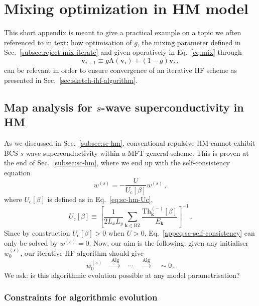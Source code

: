 \chapter{Mixing optimization in HM model}\label{app:sc-g-opt}

This short appendix is meant to give a practical example on a topic we often referenced to in text: how optimisation of $g$, the mixing parameter defined in Sec.~\ref{subsec:reject-mix-iterate} and given operatively in  Eq.~\eqref{eq:mix} through
\[
	\mathbf{v}_{i+1} \equiv g \mathrm{A} \left( \mathbf{v}_{i} \right) + (1-g) \mathbf{v}_{i} \, ,
\]
can be relevant in order to ensure convergence of an iterative HF scheme as presented in Sec.~\ref{sec:sketch-ihf-algorithm}.

\section{Map analysis for $s$-wave superconductivity in HM}

As we discussed in Sec.~\ref{subsec:sc-hm}, conventional repulsive HM cannot exhibit BCS $s$-wave superconductivity within a MFT general scheme. This is proven at the end of Sec.~\ref{subsec:sc-hm}, where we end up with the self-consistency equation
\begin{equation}\label{appeq:sc-self-consistency}
	w^{(s)} = -\frac{U}{U_\mathrm{c}[\beta]} w^{(s)} \, ,
\end{equation}
where $U_\mathrm{c}[\beta]$ is defined as in Eq.~\eqref{eq:sc-hm-Uc},
\begin{equation}\label{appeq:sc-hm-Uc}
	U_\mathrm{c}[\beta] \equiv \left[
	\frac{1}{2 L_x L_y} \sum_{\mathbf{k}\in\mathrm{BZ}} \frac{\mathrm{Th}_\mathbf{k}^{(-)}[\beta]}{E_\mathbf{k}}
	\right]^{-1} \, .
\end{equation}
Since by construction $U_\mathrm{c}[\beta] > 0$ when $U>0$, Eq.~\eqref{appeq:sc-self-consistency} can only be solved by $w^{(s)}=0$. Now, our aim is the following: given any initialiser $w^{(s)}_0$, our iterative HF algorithm should give
\[
	w^{(s)}_0
	\quad\stackrel{\mathrm{Alg}}{\to}\quad
	\cdots 
	\quad\stackrel{\mathrm{Alg}}{\to}\quad 
	\sim 0 \, .
\]
We ask: is this algorithmic evolution possible at any model parametrisation?

\subsection{Constraints for algorithmic evolution}

